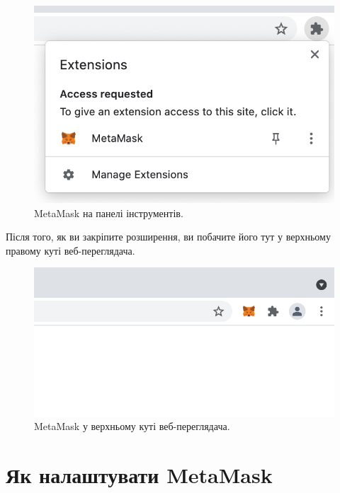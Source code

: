 \begin{enumerate}
    \begin{figure}[ht]
            \centering
            \includegraphics[scale=0.5]{IMAGES/metamask5.png}
            \caption{MetaMask на панелі інструментів.}
            \label{fig_pacman}
    \end{figure}

    Після того, як ви закріпите розширення, ви побачите його тут у верхньому правому куті веб-переглядача.

     \begin{figure}[ht]
            \centering
            \includegraphics[scale=0.5]{IMAGES/metamask6.png}
            \caption{MetaMask у верхньому куті веб-переглядача.}
            \label{fig_pacman}
    \end{figure}

\end{enumerate}

\section{Як налаштувати MetaMask}

